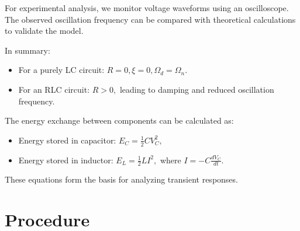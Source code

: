 \documentclass[journal]{IEEEtran}
\begin{document}
\begin{figure}[!ht]
	\centering
	\label{fig:LC circuit with internal resistance}
	
\end{figure}


For experimental analysis, we monitor voltage waveforms using an oscilloscope. The observed oscillation frequency can be compared with theoretical calculations to validate the model.

In summary:
\begin{itemize}
	\item For a purely LC circuit: \(R = 0, \xi = 0, \Omega_d = \Omega_n.\)
	\item For an RLC circuit: \(R > 0,\) leading to damping and reduced oscillation frequency.
\end{itemize}

The energy exchange between components can be calculated as:
\begin{itemize}
	\item Energy stored in capacitor: \(E_C = \frac{1}{2} C V_C^2,\)
	\item Energy stored in inductor: \(E_L = \frac{1}{2} L I^2,\) where \(I = -C \frac{dV_C}{dt}.\)
\end{itemize}

These equations form the basis for analyzing transient responses.

\section{Procedure}
\end{document}
